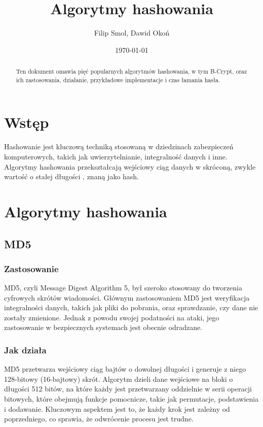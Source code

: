 \documentclass[12pt,a4paper]{article}
\title{Algorytmy hashowania}
\author{Filip Smol, Dawid Okoń}
\date{\today}
\begin{document}
\maketitle

\begin{abstract}
Ten dokument omawia pięć popularnych algorytmów hashowania, w tym B-Crypt, oraz ich zastosowania, działanie, przykładowe implementacje i czas łamania hasła.
\end{abstract}

\section{Wstęp}
Hashowanie jest kluczową techniką stosowaną w dziedzinach zabezpieczeń komputerowych, takich jak uwierzytelnianie, integralność danych i inne. Algorytmy hashowania przekształcają wejściowy ciąg danych w skróconą, zwykle wartość o stałej długości , znaną jako hash.

\section{Algorytmy hashowania}

\subsection{MD5}
\subsubsection{Zastosowanie}
MD5, czyli Message Digest Algorithm 5, był szeroko stosowany do tworzenia cyfrowych skrótów wiadomości. Głównym zastosowaniem MD5 jest weryfikacja integralności danych, takich jak pliki do pobrania, oraz sprawdzanie, czy dane nie zostały zmienione. Jednak z powodu swojej podatności na ataki, jego zastosowanie w bezpiecznych systemach jest obecnie odradzane.

\subsubsection{Jak działa}
MD5 przetwarza wejściowy ciąg bajtów o dowolnej długości i generuje z niego 128-bitowy (16-bajtowy) skrót. Algorytm dzieli dane wejściowe na bloki o długości 512 bitów, na które każdy jest przetwarzany oddzielnie w serii operacji bitowych, które obejmują funkcje pomocnicze, takie jak permutacje, podstawienia i dodawanie. Kluczowym aspektem jest to, że każdy krok jest zależny od poprzedniego, co sprawia, że odwrócenie procesu jest trudne.
\end{document}
